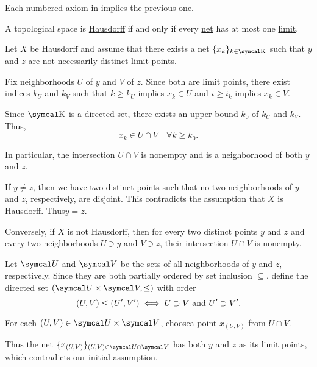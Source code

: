 \begin{Proposition}\label{thm:separation_axioms_cascade}
  Each numbered axiom in  implies the previous one.
\end{Proposition}

\begin{Proposition}\label{thm:t2_iff_singleton_limits}
  A topological space is \hyperref[def:separation_axioms/T2]{Hausdorff} if and only if every \hyperref[def:topological_net]{net} has at most one \hyperref[def:net_convergence/limit]{limit}.
\end{Proposition}
\begin{RefListProof}
    \ISufficiency Let \( X \) be Hausdorff and assume that there exists a net \( \{ x_k \}_{k \in \CK} \) such that \( y \) and \( z \) are not necessarily distinct limit points.

    Fix neighborhoods \( U \) of \( y \) and \( V \) of \( z \). Since both are limit points, there exist indices \( k_U \) and \( k_V \) such that \( k \geq k_U \) implies \( x_k \in U \) and \( i \geq i_k \) implies \( x_k \in V \).

    Since \( \CK \) is a directed set, there exists an upper bound \( k_0 \) of \( k_U \) and \( k_V \). Thus,
    \begin{equation*}
      x_k \in U \cap V \quad\forall k \geq k_0.
    \end{equation*}

    In particular, the intersection \( U \cap V \) is nonempty and is a neighborhood of both \( y \) and \( z \).

    If \( y \neq z \), then we have two distinct points such that no two neighborhoods of \( y \) and \( z \), respectively, are disjoint. This contradicts the assumption that \( X \) is Hausdorff. Thus\LEM \( y = z \).

    \INecessity Conversely, if \( X \) is not Hausdorff\LEM, then for every two distinct points \( y \) and \( z \) and every two neighborhoods \( U \ni y \) and \( V \ni z \), their intersection \( U \cap V \) is nonempty.

    Let \( \Cal{U} \) and \( \Cal{V} \) be the sets of all neighborhoods of \( y \) and \( z \), respectively. Since they are both partially ordered by set inclusion \( \subseteq \), define the directed set \( (\Cal{U} \times \Cal{V}, \leq) \) with order
    \begin{equation*}
      (U, V) \leq (U', V') \iff U \supset V \text{ and } U' \supset V'.
    \end{equation*}

    For each \( (U, V) \in \Cal{U} \times \Cal{V} \), choose\AOC a point \( x_{(U, V)} \) from \( U \cap V \).

    Thus the net \( \{ x_{(U, V)} \}_{(U, V) \in \Cal{U} \cap \Cal{V}} \) has both \( y \) and \( z \) as its limit points, which contradicts our initial assumption.
\end{RefListProof}

